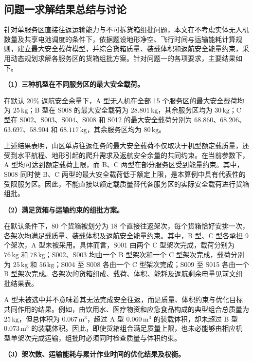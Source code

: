 \documentclass[bwprint,fontset=fandol]{gmcmthesis}
\begin{document}
\subsection{问题一求解结果总结与讨论}

针对单服务区直接往返运输能力与不可拆货箱组批问题，本文在不考虑实体无人机数量及共享电池调度的条件下，依据题设地形净空、飞行时间与运输能耗计算规则，建立最大安全载荷模型，并综合货箱质量、装载体积和返航安全能量约束，采用动态规划求解各服务区的货箱组批方案。针对问题一的各项要求，主要结果如下。

\noindent\textbf{（1）三种机型在不同服务区的最大安全载荷。}

在默认 $20\%$ 返航安全余量下，A 型无人机在全部 15 个服务区的最大安全载荷均为 $25\,\mathrm{kg}$；B 型在 S008 的最大安全载荷为 $28.801\,\mathrm{kg}$，其余服务区均为 $30\,\mathrm{kg}$；C 型在 S002、S003、S004、S008 和 S012 的最大安全载荷分别为 $68.860$、$68.206$、$63.697$、$58.904$ 和 $68.117\,\mathrm{kg}$，其余服务区均为 $80\,\mathrm{kg}$。

上述结果表明，山区单点往返任务的最大安全载荷不仅取决于机型额定载质量，还受到水平航程、地形引起的爬升需求及返航安全余量的共同约束。在当前参数下，A 型均可达到额定载荷上限，而 B、C 两型在部分服务区受到能量约束。其中，S008 同时使 B、C 两型的最大安全载荷低于额定上限，是本算例中具有代表性的受限服务区。因此，不能直接以额定载质量替代各服务区的实际安全载荷进行货箱组批。

\noindent\textbf{（2）满足货箱与运输约束的组批方案。}

在默认条件下，80 个货箱被划分为 18 个直接往返架次，每个货箱恰好安排一次，各架次均满足载质量、装载体积及返航安全能量约束。其中，B 型、C 型各承担 9 个架次，A 型未被采用。具体而言，S001 由两个 C 型架次完成，载荷分别为 $76\,\mathrm{kg}$ 和 $78\,\mathrm{kg}$；S002、S003 均由一个 B 型架次和一个 C 型架次完成，载荷分别为 $25\,\mathrm{kg}$ 和 $56\,\mathrm{kg}$；S004 至 S008 各由一个 C 型架次完成；S009 至 S015 各由一个 B 型架次完成。各架次的货箱组成、载荷、体积、能耗及返航剩余电量见前文组批结果表。

A 型未被选中并不意味着其无法完成安全往返，而是质量、体积约束与优化目标共同作用的结果。例如，由饮用水、医疗物资和应急食品构成的典型组合总质量为 $25\,\mathrm{kg}$，但总体积为 $0.067\,\mathrm{m}^{3}$，超过 A 型 $0.060\,\mathrm{m}^{3}$ 的装载体积，却未超过 B 型 $0.073\,\mathrm{m}^{3}$ 的装载体积。因此，即使货箱组合满足质量上限，也未必能够由相应机型单架次完成运输，组批时必须同时检查质量与体积约束。

\noindent\textbf{（3）架次数、运输能耗与累计作业时间的优化结果及权衡。}
\end{document}
